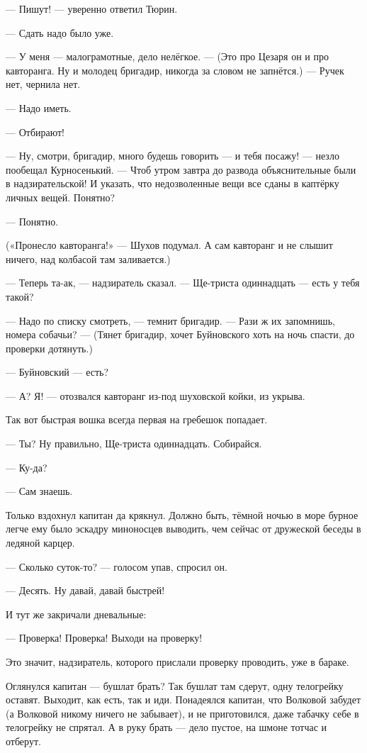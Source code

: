 --- Пишут! --- уверенно ответил Тюрин.

--- Сдать надо было уже.

--- У меня --- малограмотные, дело нелёгкое. --- (Это про Цезаря он и про кавторанга. Ну и молодец бригадир, никогда за словом не запнётся.) --- Ручек нет, чернила нет.

--- Надо иметь.

--- Отбирают!

--- Ну, смотри, бригадир, много будешь говорить --- и тебя посажу! --- незло пообещал Курносенький. --- Чтоб утром завтра до развода объяснительные были в надзирательской! И указать, что недозволенные вещи все сданы в каптёрку личных вещей. Понятно?

--- Понятно.

(«Пронесло кавторанга!» --- Шухов подумал. А сам кавторанг и не слышит ничего, над колбасой там заливается.)

--- Теперь та-ак, --- надзиратель сказал. --- Ще-триста одиннадцать --- есть у тебя такой?

--- Надо по списку смотреть, --- темнит бригадир. --- Рази ж их запомнишь, номера собачьи? --- (Тянет бригадир, хочет Буйновского хоть на ночь спасти, до проверки дотянуть.)

--- Буйновский --- есть?

--- А? Я! --- отозвался кавторанг из-под шуховской койки, из укрыва.

Так вот быстрая вошка всегда первая на гребешок попадает.

--- Ты? Ну правильно, Ще-триста одиннадцать. Собирайся.

--- Ку-да?

--- Сам знаешь.

Только вздохнул капитан да крякнул. Должно быть, тёмной ночью в море бурное легче ему было эскадру миноносцев выводить, чем сейчас от дружеской беседы в ледяной карцер.

--- Сколько суток-то? --- голосом упав, спросил он.

--- Десять. Ну давай, давай быстрей!

И тут же закричали дневальные:

--- Проверка! Проверка! Выходи на проверку!

Это значит, надзиратель, которого прислали проверку проводить, уже в бараке.

Оглянулся капитан --- бушлат брать? Так бушлат там сдерут, одну телогрейку оставят. Выходит, как есть, так и иди. Понадеялся капитан, что Волковой забудет (а Волковой никому ничего не забывает), и не приготовился, даже табачку себе в телогрейку не спрятал. А в руку брать --- дело пустое, на шмоне тотчас и отберут.

